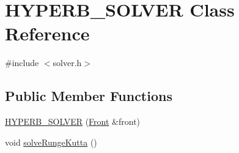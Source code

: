 \hypertarget{class_h_y_p_e_r_b___s_o_l_v_e_r}{}\section{H\+Y\+P\+E\+R\+B\+\_\+\+S\+O\+L\+V\+ER Class Reference}
\label{class_h_y_p_e_r_b___s_o_l_v_e_r}


{\ttfamily \#include $<$solver.\+h$>$}

\subsection*{Public Member Functions}
\begin{DoxyCompactItemize}
\item 
\hyperlink{class_h_y_p_e_r_b___s_o_l_v_e_r_ae1936bd9ca42cfea760e30456779a185}{H\+Y\+P\+E\+R\+B\+\_\+\+S\+O\+L\+V\+ER} (\hyperlink{fdecs_8h_ac32202b798f848095c489cfd04c4ca5f}{Front} \&front)
\item 
void \hyperlink{class_h_y_p_e_r_b___s_o_l_v_e_r_a82019e844021411535dd395ecd4df689}{solve\+Runge\+Kutta} ()
\end{DoxyCompactItemize}

